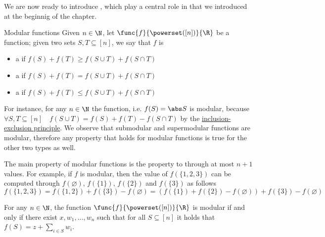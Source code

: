 \documentclass[a4paper, 12pt]{report}
\begin{document}
    We are now ready to introduce , which play a central role in  that we introduced at the beginnig of the chapter.

    \begin{frameddefn}{Modular functions}
        Given $n \in \N$, let $\func{f}{\powerset([n])}{\R}$ be a function; given two sets $S, T \subseteq [n]$, we say that $f$ is

        \begin{itemize}
            \item a  if $f(S) + f(T) \ge f(S \cup T) + f(S \cap T)$
            \item a  if $f(S) + f(T) = f(S \cup T) + f(S \cap T)$
            \item a  if $f(S) + f(T) \le f(S \cup T) + f(S \cap T)$
        \end{itemize}
    \end{frameddefn}

    For instance, for any $n \in \N$ the  function, i.e. $f(S) = \abs S$ is modular, because $\forall S, T \subseteq [n] \quad f(S \cup T) = f(S) + f(T) - f(S \cap T)$ by the \href{https://en.wikipedia.org/wiki/Inclusion%E2%80%93exclusion_principle}{inclusion-exclusion principle}. We observe that submodular and supermodular functions are modular, therefore any property that holds for modular functions is true for the other two types as well.
    
    The main property of modular functions is the property to  through at most $n + 1$ values. For example, if $f$ is modular, then the value of $f(\{1, 2, 3\})$ can be computed through $f(\varnothing)$, $f(\{1\})$, $f(\{2\})$ and $f(\{3\})$ as follows $$f(\{1, 2, 3\}) = f(\{1, 2\}) + f(\{3\})- f(\varnothing) = (f(\{1\}) + f(\{2\}) - f(\varnothing)) + f(\{3\}) - f(\varnothing)$$

    \begin{framedprop}{}
        For any $n \in \N$, the function $\func{f}{\powerset([n])}{\R}$ is modular if and only if there exist $x, w_1, \ldots, w_n$ such that for all $S \subseteq [n]$ it holds that $f(S) = z + \sum_{i \in S}{w_i}$.
    \end{framedprop}
\end{document}
